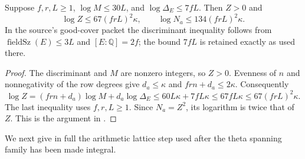 \begin{srlemma}\label{lem:ftb-intZ-size}
Suppose \(f,r,L\ge1\),
\(\log M\le30L\), and \(\log\Delta_E\le7fL\).
Then \(Z>0\) and
\[
 \log Z\le67(frL)^2\kappa,\qquad
 \log N_a\le134(frL)^2\kappa .
\]
In the source's good-cover packet the discriminant inequality follows
from \(\operatorname{fieldSz}(E)\le3L\) and \([E:\mathbb Q]=2f\);
the bound \(7fL\) is retained exactly as used there.
\end{srlemma}
\begin{proof}
The discriminant and \(M\) are nonzero integers, so \(Z>0\).
Evenness of \(n\) and nonnegativity of the row degrees give
\(d_a\le\kappa\) and \(frn+d_a\le2\kappa\).  Consequently
\[
 \log Z=(frn+d_a)\log M+d_a\log\Delta_E
 \le60L\kappa+7fL\kappa
 \le67fL\kappa
 \le67(frL)^2\kappa .
\]
The last inequality uses \(f,r,L\ge1\).  Since \(N_a=Z^2\), its logarithm
is twice that of \(Z\).  This is the argument in
.
\end{proof}

We next give in full the arithmetic lattice step used after the theta
spanning family has been made integral.

